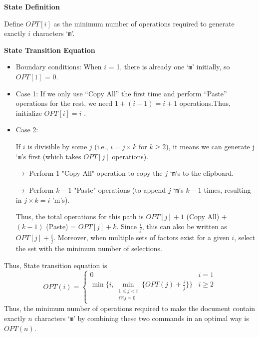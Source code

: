 \noindent \textbf{State Definition} 

Define $OPT[i]$ as the minimum number of operations required to generate exactly $i$ characters `\texttt{m}'.

\noindent \textbf{State Transition Equation}
\begin{itemize}
   \item Boundary conditions: When $i$ = 1, there is already one `\texttt{m}' initially, so $OPT[1]$ = 0.
   \item Case 1: If we only use “Copy All” the first time and perform “Paste” operations for the rest, we need $1+(i - 1) = i + 1$ operations.Thus, initialize $OPT[i] = i$ .
   \item Case 2: 
   
   If $i$ is divisible by some $j$ (i.e., $i = j \times k$ for $k \geq 2$), 
   it means we can generate j `\texttt{m}'s first (which takes $OPT[j]$ operations).
   
   $\rightarrow$ Perform 1 "Copy All" operation to copy the $j$ `\texttt{m}'s to the clipboard. 
   
   $\rightarrow$ Perform $k - 1$ "Paste" operations (to append $j$ `\texttt{m}'s $k - 1$ times, resulting in $ j \times k = i  $ 'm's).

   Thus, the total operations for this path is $OPT[j] + 1$ (Copy All) + $(k - 1)$ (Paste) = $OPT[j] + k$. Since $\frac{i}{j}$, this can also be written as $OPT[j] + \frac{i}{j}$.
   Moreover, when multiple sets of factors exist for a given $i$, select the set with the minimum number of selections.
\end{itemize}

Thus, State transition equation is
\begin{equation*}
    OPT(i)=\left\{\begin{matrix}
 0&i=1\\
 \min\{i,\min_{\substack{1 \leq j < i \\ i \% j = 0}}\{OPT(j)+\frac{i}{j}\}\}&i \geq 2
\end{matrix}\right.
\end{equation*}
Thus, the minimum number of operations required to make the document contain exactly $n$ characters `\texttt{m}' by combining these two commands in an optimal way is $OPT(n)$.
\newpage 